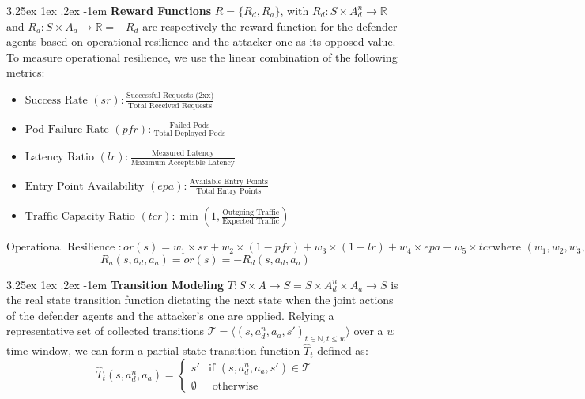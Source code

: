 \documentclass[conference]{IEEEtran}
\makeatletter
\renewcommand\paragraph{\@startsection{paragraph}{5}{\z@}%
  {3.25ex \@plus1ex \@minus.2ex}%
  {-1em}%
  {\normalfont\normalsize\bfseries}}
\makeatother
\begin{document}
\noindent \paragraph{\textbf{Reward Functions}} $R = \{R_d, R_a\}$, with $R_d: S \times A_d^n \to \mathbb{R}$ and $R_a: S \times A_a \to \mathbb{R} = - R_d$ are respectively the reward function for the defender agents based on operational resilience and the attacker one as its opposed value.
To measure operational resilience, we use the linear combination of the following metrics:
%
\begin{itemize}
    \item $\text{Success Rate } (sr) : \frac{\text{Successful Requests (2xx)}}{\text{Total Received Requests}}$

    \item $\text{Pod Failure Rate } (pfr) : \frac{\text{Failed Pods}}{\text{Total Deployed Pods}}$
    
    \item $\text{Latency Ratio } (lr) : \frac{\text{Measured Latency}}{\text{Maximum Acceptable Latency}}$
    
    \item $\text{Entry Point Availability } (epa) : \frac{\text{Available Entry Points}}{\text{Total Entry Points}}$
    
    \item $\text{Traffic Capacity Ratio } (tcr) : \min\left(1, \frac{\text{Outgoing Traffic}}{\text{Expected Traffic}}\right)$
\end{itemize}
%
$\text{Operational Resilience }: or(s) = w_1 \times sr
\allowbreak + w_2 \times (1 - pfr)
\allowbreak + w_3 \times (1 - lr)
\allowbreak + w_4 \times epa
\allowbreak + w_5 \times tcr
\text{where } (w_1, w_2, w_3, w_4, w_5) \text{ are relative weights.}$
$$
R_a(s, a_d, a_a) = or(s) = -R_d(s, a_d, a_a)
$$

\noindent \paragraph{\textbf{Transition Modeling}} $T: S \times A \rightarrow S = S \times A_d^n \times A_a \to S$ is the real state transition function dictating the next state when the joint actions of the defender agents and the attacker's one are applied. Relying a representative set of collected transitions $\mathcal{T} = \langle(s, a_d^n, a_a, s')_{t\in \mathbb{N}, t \leq w}\rangle$ over a $w$ time window, we can form a partial state transition function $\hat{T}_t$ defined as:
%
$$
\hat{T}_t(s, a_d^n, a_a) =
\begin{cases} 
    s' & \text{if } (s, a_d^n, a_a, s') \in \mathcal{T} \\
    \emptyset & \text{ otherwise}
\end{cases}
$$
\end{document}

